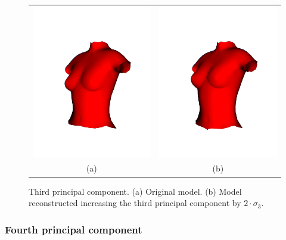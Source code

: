 \begin{figure}[H]
    \centering
    \begin{tabular}{@{}cc@{}}
        \includegraphics[width=0.487\linewidth]{figures/20230529-pca_base.jpg}&
        \includegraphics[width=0.487\linewidth]{figures/20230529-pca_2_comp.jpg}\\
        (a)&(b)\\
        \end{tabular}
    \caption[Third principal component]{Third principal component.
    \textup{(a)} Original model.
    \textup{(b)} Model reconstructed increasing the third principal component by $2 \cdot \sigma_3$.
    }

    \label{fig:pca_2}
\end{figure}


\subsubsection{Fourth principal component}

